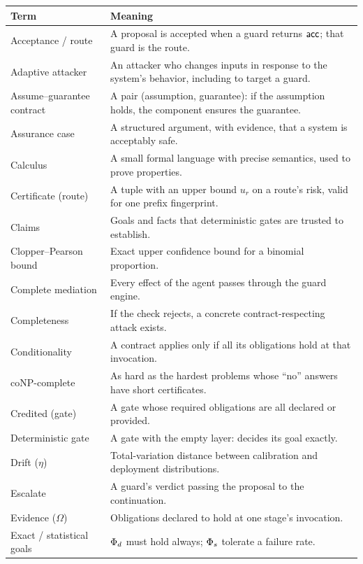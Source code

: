 \begin{center}
\renewcommand{\arraystretch}{1.2}
\small
\begin{longtable}{@{}p{3.4cm}p{12.4cm}@{}}
\toprule
\textbf{Term} & \textbf{Meaning}\\
\midrule
\endhead
Acceptance / route & A proposal is accepted when a guard returns $\mathsf{acc}$; that guard is the route.\\
Adaptive attacker & An attacker who changes inputs in response to the system's behavior, including to target a guard.\\
Assume--guarantee contract & A pair (assumption, guarantee): if the assumption holds, the component ensures the guarantee.\\
Assurance case & A structured argument, with evidence, that a system is acceptably safe.\\
Calculus & A small formal language with precise semantics, used to prove properties.\\
Certificate (route) & A tuple with an upper bound $u_r$ on a route's risk, valid for one prefix fingerprint.\\
Claims & Goals and facts that deterministic gates are trusted to establish.\\
Clopper--Pearson bound & Exact upper confidence bound for a binomial proportion.\\
Complete mediation & Every effect of the agent passes through the guard engine.\\
Completeness & If the check rejects, a concrete contract-respecting attack exists.\\
Conditionality & A contract applies only if all its obligations hold at that invocation.\\
coNP-complete & As hard as the hardest problems whose ``no'' answers have short certificates.\\
Credited (gate) & A gate whose required obligations are all declared or provided.\\
Deterministic gate & A gate with the empty layer: decides its goal exactly.\\
Drift ($\eta$) & Total-variation distance between calibration and deployment distributions.\\
Escalate & A guard's verdict passing the proposal to the continuation.\\
Evidence ($\Omega$) & Obligations declared to hold at one stage's invocation.\\
Exact / statistical goals & $\Phi_d$ must hold always; $\Phi_s$ tolerate a failure rate.\\

\end{longtable}
\end{center}
